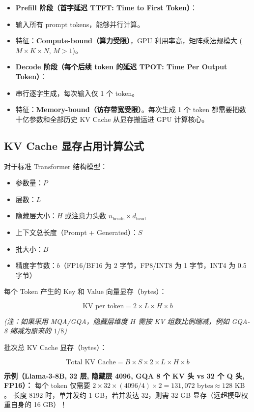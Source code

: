 \begin{itemize}
  \item \textbf{Prefill 阶段（首字延迟 TTFT: Time to First Token）}：
  \item 输入所有 prompt tokens，能够并行计算。
  \item 特征：\textbf{Compute-bound（算力受限）}，GPU 利用率高，矩阵乘法规模大 ($M \times K \times N$, $M > 1$)。
  \item \textbf{Decode 阶段（每个后续 token 的延迟 TPOT: Time Per Output Token）}：
  \item 串行逐字生成，每次输入仅 1 个 token。
  \item 特征：\textbf{Memory-bound（访存带宽受限）}。每次生成 1 个 token 都需要把数十亿参数和全部历史 KV Cache 从显存搬运进 GPU 计算核心。
\end{itemize}

\subsection{KV Cache 显存占用计算公式}

对于标准 Transformer 结构模型：
\begin{itemize}
  \item 参数量：$P$
  \item 层数：$L$
  \item 隐藏层大小：$H$ 或注意力头数 $n_{\text{heads}} \times d_{\text{head}}$
  \item 上下文总长度（Prompt + Generated）：$S$
  \item 批大小：$B$
  \item 精度字节数：$b$（FP16/BF16 为 2 字节，FP8/INT8 为 1 字节，INT4 为 0.5 字节）
\end{itemize}

每个 Token 产生的 Key 和 Value 向量显存（bytes）：

\[
\text{KV per token} = 2 \times L \times H \times b
\]

\textit{(注：如果采用 MQA/GQA，隐藏层维度 $H$ 需按 KV 组数比例缩减，例如 GQA-8 缩减为原来的 $1/8$)}

批次总 KV Cache 显存（bytes）：

\[
\text{Total KV Cache} = B \times S \times 2 \times L \times H \times b
\]

\begin{noteBox}[核心导读与背景]
\textbf{示例（Llama-3-8B, 32 层, 隐藏层 4096, GQA 8 个 KV 头 vs 32 个 Q 头, FP16）：}
每个 token 仅需要 $2 \times 32 \times (4096/4) \times 2 = 131,072 \text{ bytes} \approx 128 \text{ KB}$。
长度 8192 时，单并发约 1 GB，若并发达 32，则需 32 GB 显存（远超模型权重自身的 16 GB）！
\end{noteBox}

